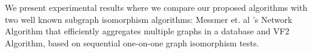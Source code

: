 We present experimental results where we compare our proposed algorithms with two well known subgraph isomorphism algorithms: Messmer et. al 's\cite{messmer} Network Algorithm that efficiently aggregates multiple graphs in a database
 and VF2\cite{vf} Algorithm, based on sequential one-on-one graph isomorphism tests. 

